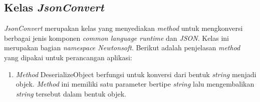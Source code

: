 \subsection{Kelas \textit{JsonConvert}}
\label{lab:Kelas JsonConvert}
\hspace{0.5cm} \textit{JsonConvert} merupakan kelas yang menyediakan \textit{method} untuk mengkonversi berbagai jenis komponen \textit{common language runtime} dan \textit{JSON}. Kelas ini merupakan bagian \textit{namespace Newtonsoft}.  Berikut adalah penjelasan \textit{method} yang dipakai untuk perancangan aplikasi:
\begin{enumerate}
	\item \textit{Method} DeserializeObject berfungsi untuk konversi dari bentuk \textit{string} menjadi objek. \textit{Method} ini memiliki satu parameter bertipe \textit{string} lalu mengembalikan \textit{string} tersebut dalam bentuk objek.
\end{enumerate}

